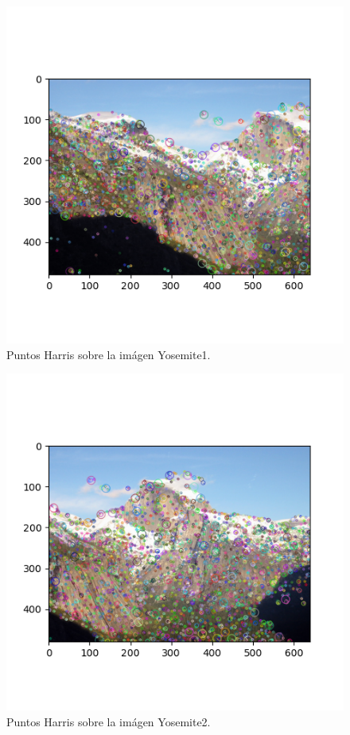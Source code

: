 \documentclass[12pt, spanish]{article}
\begin{document}
\begin{figure}[H]
  \centering
      \includegraphics[width=\textwidth]{p_harris_h_10.png}
 		\caption{Puntos Harris sobre la imágen Yosemite1.}
\end{figure}

\begin{figure}[H]
  \centering
      \includegraphics[width=\textwidth]{p_harris_h_10_y2.png}
 		\caption{Puntos Harris sobre la imágen Yosemite2.}
\end{figure}
\end{document}
